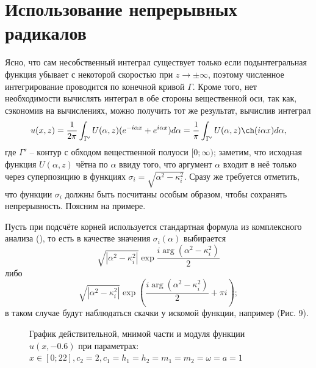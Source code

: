 \documentclass[a4paper, 12pt]{article}
\begin{document}
\section{Использование непрерывных радикалов}
Ясно, что сам несобственный интеграл существует только если подынтегральная функция убывает с некоторой скоростью при $z\rightarrow \pm \infty$, поэтому численное интегрирование проводится по конечной кривой $\Gamma$. Кроме того, нет необходимости вычислять интеграл в обе стороны вещественной оси, так как, сэкономив на вычислениях, можно получить тот же результат, вычислив интеграл
$$u(x,z) =\frac{1}{2\pi} \int_{\Gamma'} U(\alpha, z) (e^{-i \alpha x}+e^{i \alpha x}) d\alpha=\frac{1}{\pi}\int_{\Gamma'} U(\alpha, z) \ch (i \alpha x) d\alpha,$$
где $\Gamma'$ -- контур с обходом вещественной полуоси $[0;\infty)$; заметим, что исходная функция $U(\alpha,z)$ чётна по $\alpha$ ввиду того, что аргумент $\alpha$ входит в неё только через суперпозицию в функциях $\sigma_i = \sqrt{\alpha^2-\kappa^2_i}$. Сразу же требуется отметить, что функции $\sigma_i$ должны быть посчитаны особым образом, чтобы сохранять непрерывность. Поясним на примере.

Пусть при подсчёте корней используется стандартная формула из комплексного анализа (\cite{tfkp, korn}), то есть в качестве значения $\sigma_i(\alpha)$ выбирается 
$$\sqrt{|\alpha^2-\kappa^2_i|}\exp{\dfrac{i \arg (\alpha^2-\kappa^2_i)}{2}}$$ 
либо
$$\sqrt{|\alpha^2-\kappa^2_i|}\exp\left({\dfrac{i \arg (\alpha^2-\kappa^2_i)}{2}+\pi i}\right);$$
в таком случае будут наблюдаться скачки у искомой функции, например (Рис. 9).
\begin{figure}[h!]
\noindent{}
\caption{График действительной, мнимой части и модуля функции $u(x,-0.6)$ при параметрах: $x \in [0;22], c_2=2, c_1=h_1=h_2=m_1=m_2=\omega=a=1$}
\label{figCurves}
\end{figure}
\end{document}

